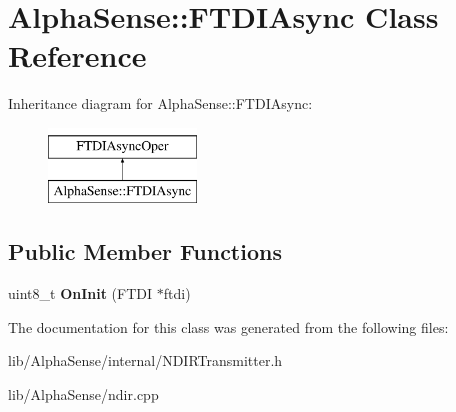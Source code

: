 \hypertarget{classAlphaSense_1_1FTDIAsync}{}\section{Alpha\+Sense\+:\+:F\+T\+D\+I\+Async Class Reference}
\label{classAlphaSense_1_1FTDIAsync}
Inheritance diagram for Alpha\+Sense\+:\+:F\+T\+D\+I\+Async\+:\begin{figure}[H]
\begin{center}
\leavevmode
\includegraphics[height=2.000000cm]{classAlphaSense_1_1FTDIAsync}
\end{center}
\end{figure}
\subsection*{Public Member Functions}
\begin{DoxyCompactItemize}
\item 
\mbox{\label{classAlphaSense_1_1FTDIAsync_aec270f62769014df4ecec1278d248758}} 
uint8\+\_\+t {\bfseries On\+Init} (F\+T\+DI $\ast$ftdi)
\end{DoxyCompactItemize}


The documentation for this class was generated from the following files\+:\begin{DoxyCompactItemize}
\item 
lib/\+Alpha\+Sense/internal/N\+D\+I\+R\+Transmitter.\+h\item 
lib/\+Alpha\+Sense/ndir.\+cpp\end{DoxyCompactItemize}
